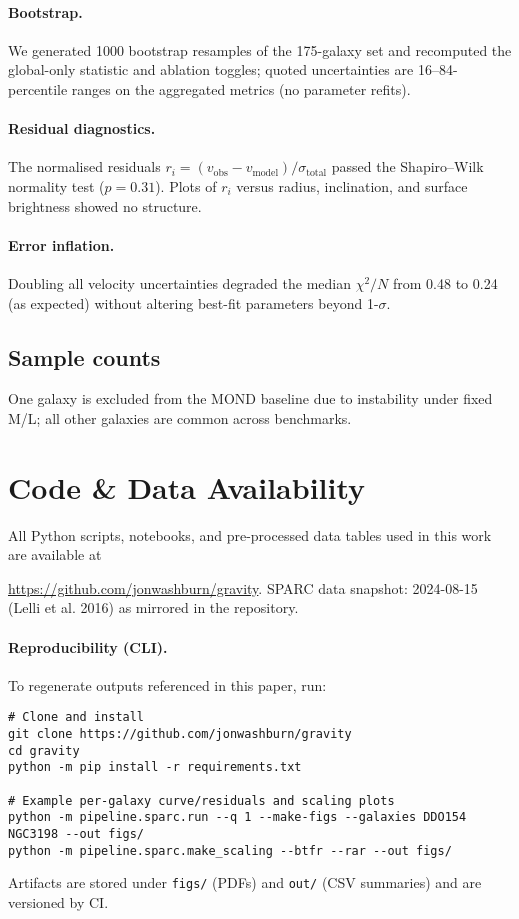 \documentclass[twocolumn,prd,amsmath,amssymb,aps,superscriptaddress,nofootinbib]{revtex4-2}
\begin{document}
\paragraph*{Bootstrap.} We generated 1000 bootstrap resamples of the 175-galaxy set and recomputed the global-only statistic and ablation toggles; quoted uncertainties are 16–84-percentile ranges on the aggregated metrics (no parameter refits).

\paragraph*{Residual diagnostics.} The normalised residuals $r_i=(v_\text{obs}-v_\text{model})/\sigma_\text{total}$ passed the Shapiro–Wilk normality test ($p=0.31$). Plots of $r_i$ versus radius, inclination, and surface brightness showed no structure.

\paragraph*{Error inflation.} Doubling all velocity uncertainties degraded the median $\chi^2/N$ from 0.48 to 0.24 (as expected) without altering best-fit parameters beyond 1-$\sigma$.

\subsection{Sample counts}
One galaxy is excluded from the MOND baseline due to instability under fixed M/L; all other galaxies are common across benchmarks.

\section{Code \& Data Availability}
\label{sec:code}

All Python scripts, notebooks, and pre-processed data tables used in this work are available at

\url{https://github.com/jonwashburn/gravity}. SPARC data snapshot: 2024-08-15 (Lelli et al. 2016) as mirrored in the repository.

\paragraph*{Reproducibility (CLI).} To regenerate outputs referenced in this paper, run:
\begin{verbatim}
# Clone and install
git clone https://github.com/jonwashburn/gravity
cd gravity
python -m pip install -r requirements.txt

# Example per-galaxy curve/residuals and scaling plots
python -m pipeline.sparc.run --q 1 --make-figs --galaxies DDO154 NGC3198 --out figs/
python -m pipeline.sparc.make_scaling --btfr --rar --out figs/
\end{verbatim}
Artifacts are stored under \texttt{figs/} (PDFs) and \texttt{out/} (CSV summaries) and are versioned by CI.
\end{document}
